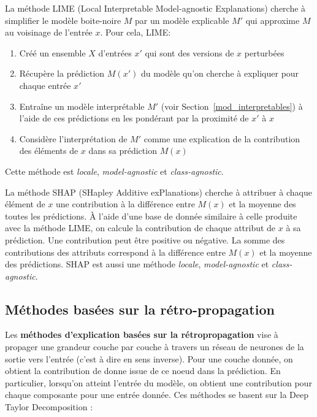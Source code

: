 \documentclass{report}
\begin{document}
        La méthode LIME (Local Interpretable Model-agnostic Explanations) \cite{molnar_interpretable_2025, ribeiro_model-agnostic_2016} cherche à simplifier le modèle boite-noire $M$ par un modèle explicable $M'$ qui approxime $M$ au voisinage de l'entrée $x$. Pour cela, LIME:
        \begin{enumerate}
            \item Créé un ensemble $X$ d'entrées $x'$ qui sont des versions de $x$ perturbées
            \item Récupère la prédiction $M(x')$ du modèle qu'on cherche à expliquer pour chaque entrée $x'$
            \item Entraîne un modèle interprétable $M'$ (voir Section~\ref{mod_interpretables}) à l'aide de ces prédictions en les pondérant par la proximité de $x'$ à $x$
            \item Considère l'interprétation de $M'$ comme une explication de la contribution des éléments de $x$ dans sa prédiction $M(x)$
        \end{enumerate}
        Cette méthode est \emph{locale}, \emph{model-agnostic} et \emph{class-agnostic}.
        
        La méthode SHAP (SHapley Additive exPlanations) \cite{molnar_interpretable_2025, lundberg_unified_2017} cherche à attribuer à chaque élément de $x$ une contribution à la différence entre $M(x)$ et la moyenne des toutes les prédictions. À l'aide d'une base de donnée similaire à celle produite avec la méthode LIME, on calcule la contribution de chaque attribut de $x$ à sa prédiction. Une contribution peut être positive ou négative. La somme des contributions des attributs correspond à la différence entre $M(x)$ et la moyenne des prédictions. SHAP est aussi une méthode \emph{locale}, \emph{model-agnostic} et \emph{class-agnostic}.\\

    \subsection{Méthodes basées sur la rétro-propagation}
        
        Les \textbf{méthodes d'explication basées sur la rétropropagation} vise à propager une grandeur couche par couche à travers un réseau de neurones de la sortie vers l'entrée (c'est à dire en sens inverse). Pour une couche donnée, on obtient la contribution de donne issue de ce noeud dans la prédiction. En particulier, lorsqu'on atteint l'entrée du modèle, on obtient une contribution pour chaque composante pour une entrée donnée. Ces méthodes se basent sur la Deep Taylor Decomposition \cite{montavon_explaining_2017} : 
        
\end{document}

